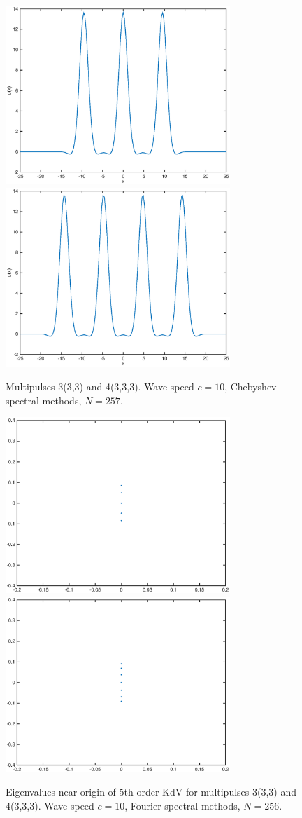 \documentclass[12pt]{article}
\begin{document}
\begin{figure}[H]
	\includegraphics[width=8.5cm]{cheb10um2_3.eps}
	\includegraphics[width=8.5cm]{cheb10um2_4.eps}
	\caption{Multipulses 3(3,3) and 4(3,3,3). Wave speed $c = 10$, Chebyshev spectral methods, $N = 257$.}
\end{figure}

\begin{figure}[H]
	\includegraphics[width=8.5cm]{cheb10um2_3lambda.eps}
	\includegraphics[width=8.5cm]{cheb10um2_4lambda.eps}
	\caption{Eigenvalues near origin of 5th order KdV for multipulses 3(3,3) and 4(3,3,3). Wave speed $c = 10$, Fourier spectral methods, $N = 256$. }
\end{figure}
\end{document}
